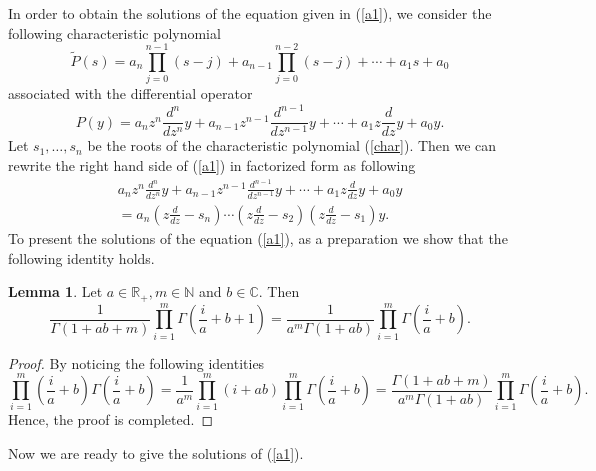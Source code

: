 \documentclass[12pt]{article}
\theoremstyle{definition}
\newtheorem{lemma}{Lemma}
\begin{document}
 In order to obtain the solutions of the equation given in (\ref{a1}), we consider the following characteristic polynomial
\begin{equation}\label{char}
    \widetilde  P(s)=a_n\prod\limits_{j=0}^{n-1}(s-j)+ a_{n-1}\prod\limits_{j=0}^{n-2}(s-j)+ \cdots+ a_1s +a_0
\end{equation}
  associated with the differential operator
  $$
  P(y)=a_nz^n\frac{d^n}{dz^n}y+a_{n-1}z^{n-1}\frac{d^{n-1}}{dz^{n-1}}y+\cdots+ a_1z\frac{d}{dz}y +a_0y.
  $$
  Let $s_1,\dots,s_n$ be the roots of the characteristic polynomial (\ref{char}). Then we can rewrite the right hand side of (\ref{a1}) in factorized form as following
  \begin{multline*}
    a_nz^n\frac{d^n}{dz^n}y+a_{n-1}z^{n-1}\frac{d^{n-1}}{dz^{n-1}}y+\cdots+ a_1z\frac{d}{dz}y +a_0y\\
    =a_n\left(z\frac{d}{dz}-s_n\right)\cdots\left(z\frac{d}{dz}-s_2\right)\left(z\frac{d}{dz}-s_1\right)y.
\end{multline*}
To present the solutions of the equation (\ref{a1}), as a preparation we show that the following identity holds.
\begin{lemma}\label{lem1}
Let $a\in\mathbb{R}_{+}, m\in \mathbb{N}$ and $b\in\mathbb{C}$. Then
\begin{equation}\label{lemeq}
    \frac{1}{\Gamma(1+ab+m)}\prod_{i=1}^{m}\Gamma\left(\frac{i}{a}+b+1\right)=\frac{1}{a^m\Gamma(1+ab)}\prod_{i=1}^m\Gamma\left(\frac{i}{a}+b\right).
\end{equation}
\end{lemma}
\begin{proof}
By noticing the following identities
$$
\prod_{i=1}^m\left(\frac{i}{a}+b\right)\Gamma\left(\frac{i}{a}+b\right)=\frac{1}{a^m}\prod_{i=1}^m(i+ab)\prod_{i=1}^m\Gamma\left(\frac{i}{a}+b\right)=\frac{\Gamma(1+ab+m)}{a^m\Gamma(1+ab)}\prod_{i=1}^m\Gamma\left(\frac{i}{a}+b\right).$$
Hence, the proof is completed. 
\end{proof}
Now we are ready to give the solutions of (\ref{a1}).
\end{document}
